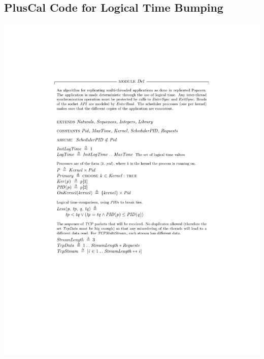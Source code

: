 \documentclass[12pt]{report}
\begin{document}
\begin{appendices}
\chapter{PlusCal Code for Logical Time Bumping} \label{app:tickbump}
\newpage

\hspace{-2.5cm}\includegraphics[page=1,scale=1]{tla/Det.pdf}


\end{appendices}
\end{document}
